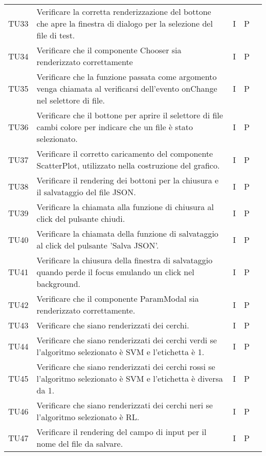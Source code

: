 \begin{longtable} {
		>{}p{15mm} 
		>{}p{79.5mm}
		>{}p{15mm} 
		>{}p{15mm}
		>{}p{0mm}}
	TU33    	& Verificare la corretta renderizzazione del bottone che apre la finestra di dialogo per la selezione del file di test. & I & P &\TBstrut \\ [2mm]
	TU34		& Verificare che il componente Chooser sia renderizzato correttamente& I & P &\TBstrut \\ [2mm]
	TU35    	& Verificare che la funzione passata come argomento venga chiamata al verificarsi dell'evento onChange nel selettore di file. & I & P &\TBstrut \\ [2mm]
	TU36    	& Verificare che il bottone per aprire il selettore di file cambi colore per indicare che un file è stato selezionato. & I & P &\TBstrut \\ [2mm]
	
	TU37    	& Verificare il corretto caricamento del componente ScatterPlot, utilizzato nella costruzione del grafico. & I & P &\TBstrut \\ [2mm]
	TU38    	& Verificare il rendering dei bottoni per la chiusura e il salvataggio del file JSON. & I & P &\TBstrut \\ [2mm]
	TU39    	& Verificare la chiamata alla funzione di chiusura al click del pulsante chiudi. & I & P &\TBstrut \\ [2mm]
	TU40    	& Verificare la chiamata della funzione di salvataggio al click del pulsante 'Salva JSON'. & I & P &\TBstrut \\ [2mm]
	TU41    	& Verificare la chiusura della finestra di salvataggio quando perde il focus emulando un click nel background. & I & P &\TBstrut \\ [2mm]
	TU42		& Verificare che il componente ParamModal sia renderizzato correttamente. & I & P &\TBstrut \\ [2mm]
	TU43		& Verificare che siano renderizzati dei cerchi.& I & P &\TBstrut \\ [2mm]
	TU44		& Verificare che siano renderizzati dei cerchi verdi se l'algoritmo selezionato è SVM e l'etichetta è 1.& I & P &\TBstrut \\ [2mm]
	TU45		& Verificare che siano renderizzati dei cerchi rossi se l'algoritmo selezionato è SVM e l'etichetta è diversa da 1.& I & P &\TBstrut \\ [2mm]
	TU46		& Verificare che siano renderizzati dei cerchi neri se l'algoritmo selezionato è RL.& I & P &\TBstrut \\ [2mm]
	TU47    	& Verificare il rendering del campo di input per il nome del file da salvare. & I & P &\TBstrut \\ [2mm]

\end{longtable}
